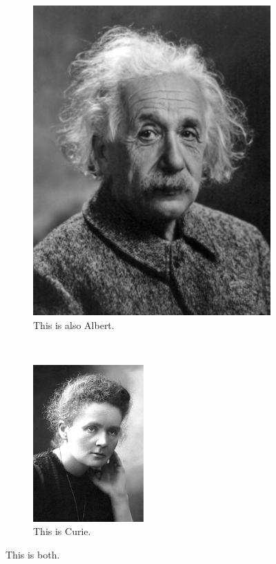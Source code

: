 \documentclass[12pt,a4paper]{article}
\begin{document}
\begin{figure}
	\centering

	\begin{subfigure}[h]{6cm}
		\includegraphics[width=5 cm]{albert.jpg}
		\caption{This is also Albert.} \label{sub21}
	\end{subfigure}
	~ %
	\begin{subfigure}[h]{6cm}
		\includegraphics[height=60mm]{curie.jpg}
		\caption{This is Curie.} \label{sub22}
	\end{subfigure}
	
	\caption{This is both.} \label{fig2}

\end{figure}
\end{document}
